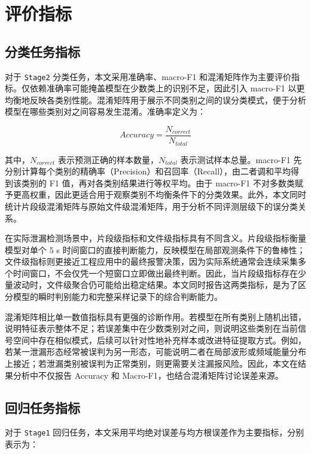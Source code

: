 \section{评价指标}

\subsection{分类任务指标}

对于 \texttt{Stage2} 分类任务，本文采用准确率、macro-F1 和混淆矩阵作为主要评价指标。仅依赖准确率可能掩盖模型在少数类上的识别不足，因此引入 macro-F1 以更均衡地反映各类别性能。混淆矩阵用于展示不同类别之间的误分类模式，便于分析模型在哪些类别对之间容易发生混淆。准确率定义为：

\begin{equation}
Accuracy = \frac{N_{correct}}{N_{total}}
\end{equation}

其中，$N_{correct}$ 表示预测正确的样本数量，$N_{total}$ 表示测试样本总量。macro-F1 先分别计算每个类别的精确率（Precision）和召回率（Recall），由二者调和平均得到该类别的 F1 值，再对各类别结果进行等权平均。由于 macro-F1 不对多数类赋予更高权重，因此更适合用于观察类别不均衡条件下的分类效果。此外，本文同时统计片段级混淆矩阵与原始文件级混淆矩阵，用于分析不同评测层级下的误分类关系。

在实际泄漏检测场景中，片段级指标和文件级指标具有不同含义。片段级指标衡量模型对单个 5 s 时间窗口的直接判断能力，反映模型在局部观测条件下的鲁棒性；文件级指标则更接近工程应用中的最终报警决策，因为实际系统通常会连续采集多个时间窗口，不会仅凭一个短窗口立即做出最终判断。因此，当片段级指标存在少量波动时，文件级聚合仍可能给出稳定结果。本文同时报告这两类指标，是为了区分模型的瞬时判别能力和完整采样记录下的综合判断能力。

混淆矩阵相比单一数值指标具有更强的诊断作用。若模型在所有类别上随机出错，说明特征表示整体不足；若误差集中在少数类别对之间，则说明这些类别在当前信号空间中存在相似模式，后续可以针对性地补充样本或改进特征提取方式。例如，若某一泄漏形态经常被误判为另一形态，可能说明二者在局部波形或频域能量分布上接近；若泄漏类别被误判为正常类别，则更需要关注漏报风险。因此，本文在结果分析中不仅报告 Accuracy 和 Macro-F1，也结合混淆矩阵讨论误差来源。

\subsection{回归任务指标}

对于 \texttt{Stage1} 回归任务，本文采用平均绝对误差与均方根误差作为主要指标，分别表示为：

